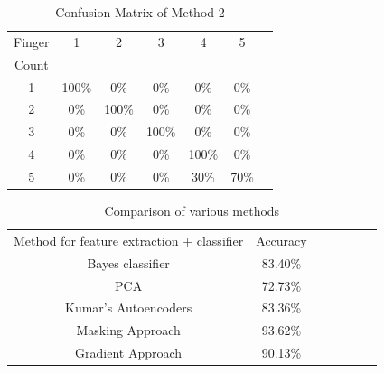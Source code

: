 \documentclass[conference]{IEEEtran}
\begin{document}
\begin{table}[h!]
\caption{Confusion Matrix of Method 2}
\begin{center}
\begin{tabular}{|c|c|c|c|c|c|c|}
\hline
\multicolumn{1}{|c|}{Finger}
& \multicolumn{1}{|c|}{1}
& \multicolumn{1}{|c|}{2}
& \multicolumn{1}{|c|}{3}
& \multicolumn{1}{|c|}{4}
& \multicolumn{1}{|c|}{5}\\
Count &  &  &  &  &\\ \hline
1  &  100\%  &  0\%  & 0\%  & 0\% & 0\%\\ \hline
2  &  0\%  &  100\%  & 0\%  & 0\% & 0\%\\ \hline
3  &  0\%  &  0\%  & 100\%  & 0\% & 0\%\\ \hline
4  &  0\%  &  0\%  & 0\%  & 100\% & 0\%\\ \hline
5  &  0\%  &  0\%  & 0\%  & 30\% & 70\%\\ \hline
\end{tabular}
\label{table-tab2}
\end{center}
\end{table}


%
%
%

\begin{table}[h!]
\caption{Comparison of various methods}
\begin{center}
\begin{tabular}{|c|c|c|c|c|c|c|}
\hline
\multicolumn{1}{|c|}{Method for feature extraction + classifier}
& \multicolumn{1}{|c|}{Accuracy}\\
Bayes classifier\cite{Avraam2014StaticGR} & 83.40\% \\ \hline
PCA & 72.73\% \\ \hline
Kumar's Autoencoders\cite{kumar2014static} & 83.36\% \\ \hline
Masking Approach & 93.62\% \\ \hline
Gradient Approach & 90.13\% \\ \hline
\end{tabular}
\label{table-tab2}
\end{center}
\end{table}
\end{document}
